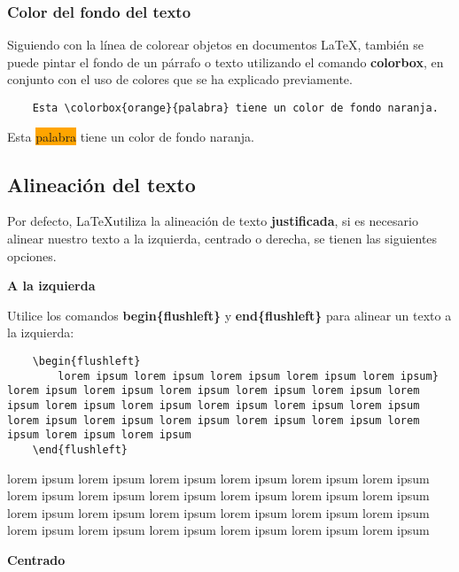 \subsubsection{Color del fondo del texto}

Siguiendo con la línea de colorear objetos en documentos \LaTeX, también se puede pintar el fondo de un párrafo o texto utilizando el comando \textbf{colorbox}, en conjunto con el uso de colores que se ha explicado previamente.
\begin{lstlisting}
    Esta \colorbox{orange}{palabra} tiene un color de fondo naranja.
\end{lstlisting}

Esta \colorbox{orange}{palabra} tiene un color de fondo naranja.


\subsection{Alineación del texto}

Por defecto, \LaTeX utiliza la alineación de texto \textbf{justificada}, si es necesario alinear nuestro texto a la izquierda, centrado o derecha, se tienen las siguientes opciones.

\textbf{A la izquierda}

Utilice los comandos \textbf{begin\{flushleft\}} y \textbf{end\{flushleft\}} para alinear un texto a la izquierda:
\begin{lstlisting}
    \begin{flushleft}
        lorem ipsum lorem ipsum lorem ipsum lorem ipsum lorem ipsum} lorem ipsum lorem ipsum lorem ipsum lorem ipsum lorem ipsum lorem ipsum lorem ipsum lorem ipsum lorem ipsum lorem ipsum lorem ipsum lorem ipsum lorem ipsum lorem ipsum lorem ipsum lorem ipsum lorem ipsum lorem ipsum lorem ipsum
    \end{flushleft}
\end{lstlisting}
\begin{flushleft}
    lorem ipsum lorem ipsum lorem ipsum lorem ipsum lorem ipsum lorem ipsum lorem ipsum lorem ipsum lorem ipsum lorem ipsum lorem ipsum lorem ipsum lorem ipsum lorem ipsum lorem ipsum lorem ipsum lorem ipsum lorem ipsum lorem ipsum lorem ipsum lorem ipsum lorem ipsum lorem ipsum lorem ipsum 
\end{flushleft}

\textbf{Centrado}

